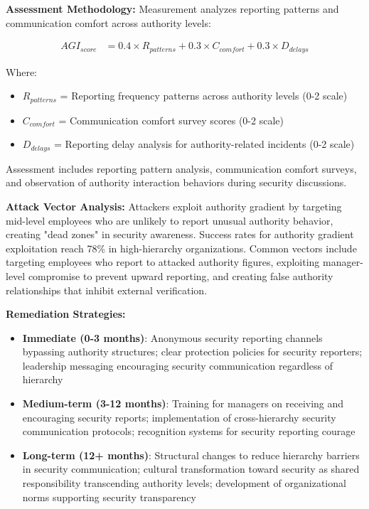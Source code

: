 \documentclass[11pt,a4paper]{article}
\begin{document}
\textbf{Assessment Methodology:}
Measurement analyzes reporting patterns and communication comfort across authority levels:

\begin{align}
AGI_{score} &= 0.4 \times R_{patterns} + 0.3 \times C_{comfort} + 0.3 \times D_{delays}
\end{align}

Where:
\begin{itemize}
\item $R_{patterns}$ = Reporting frequency patterns across authority levels (0-2 scale)
\item $C_{comfort}$ = Communication comfort survey scores (0-2 scale)
\item $D_{delays}$ = Reporting delay analysis for authority-related incidents (0-2 scale)
\end{itemize}

Assessment includes reporting pattern analysis, communication comfort surveys, and observation of authority interaction behaviors during security discussions.

\textbf{Attack Vector Analysis:}
Attackers exploit authority gradient by targeting mid-level employees who are unlikely to report unusual authority behavior, creating "dead zones" in security awareness. Success rates for authority gradient exploitation reach 78\% in high-hierarchy organizations. Common vectors include targeting employees who report to attacked authority figures, exploiting manager-level compromise to prevent upward reporting, and creating false authority relationships that inhibit external verification.

\textbf{Remediation Strategies:}
\begin{itemize}
\item \textbf{Immediate (0-3 months)}: Anonymous security reporting channels bypassing authority structures; clear protection policies for security reporters; leadership messaging encouraging security communication regardless of hierarchy
\item \textbf{Medium-term (3-12 months)}: Training for managers on receiving and encouraging security reports; implementation of cross-hierarchy security communication protocols; recognition systems for security reporting courage
\item \textbf{Long-term (12+ months)}: Structural changes to reduce hierarchy barriers in security communication; cultural transformation toward security as shared responsibility transcending authority levels; development of organizational norms supporting security transparency
\end{itemize}
\end{document}
